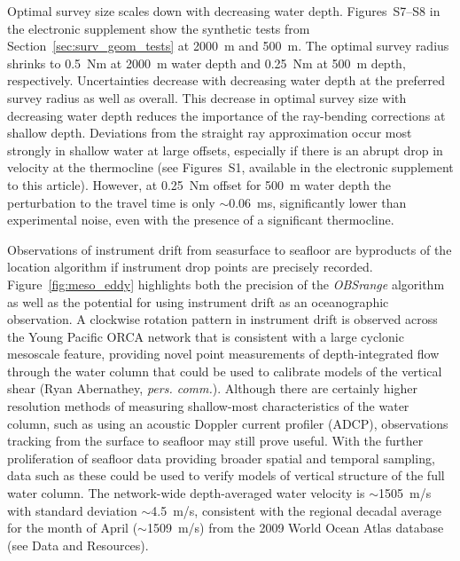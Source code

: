 Optimal survey size scales down with decreasing water depth. Figures~S7--S8 in the electronic supplement show the synthetic tests from Section~\ref{sec:surv_geom_tests} at 2000~m and 500~m. The optimal survey radius shrinks to 0.5~Nm at 2000~m water depth and 0.25~Nm at 500~m depth, respectively. Uncertainties decrease with decreasing water depth at the preferred survey radius as well as overall. This decrease in optimal survey size with decreasing water depth reduces the importance of the ray-bending corrections at shallow depth. Deviations from the straight ray approximation occur most strongly in shallow water at large offsets, especially if there is an abrupt drop in velocity at the thermocline (see Figures~S1, available in the electronic supplement to this article). However, at 0.25~Nm offset for 500~m water depth the perturbation to the travel time is only $\sim$0.06~ms, significantly lower than experimental noise, even with the presence of a significant thermocline.

Observations of instrument drift from seasurface to seafloor are byproducts of the location algorithm if instrument drop points are precisely recorded. Figure~\ref{fig:meso_eddy} highlights both the precision of the \textit{OBSrange} algorithm as well as the potential for using instrument drift as an oceanographic observation. A clockwise rotation pattern in instrument drift is observed across the Young Pacific ORCA network that is consistent with a large cyclonic mesoscale feature, providing novel point measurements of depth-integrated flow through the water column that could be used to calibrate models of the vertical shear (Ryan Abernathey, \textit{pers. comm.}). Although there are certainly higher resolution methods of measuring shallow-most characteristics of the water column, such as using an acoustic Doppler current profiler (ADCP), observations tracking from the surface to seafloor may still prove useful. With the further proliferation of seafloor data providing broader spatial and temporal sampling, data such as these could be used to verify models of vertical structure of the full water column. The network-wide depth-averaged water velocity is $\sim$1505~m/s with standard deviation $\sim$4.5~m/s, consistent with the regional decadal average for the month of April ($\sim$1509~m/s) from the 2009 World Ocean Atlas database (see Data and Resources).

